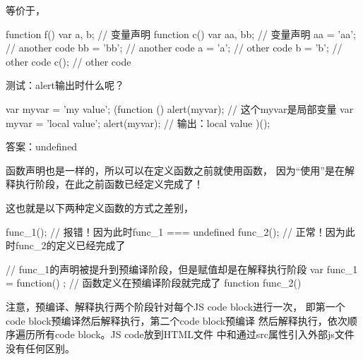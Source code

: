 等价于，

\begin{javascriptcode}
  function f() {
    var a, b; // 变量声明
    function c() {
      var aa, bb; // 变量声明
      aa = 'aa';
      // another code
      bb = 'bb';
      // another code
    }
    a = 'a';
    // other code
    b = 'b';
    // other code
    c();
    // other code
  }
\end{javascriptcode}

测试：alert输出时什么呢？

\begin{javascriptcode}
  var myvar = 'my value';
  (function () {
    alert(myvar); // 这个myvar是局部变量
    var myvar = 'local value';
    alert(myvar); // 输出：local value
  })();
\end{javascriptcode}

答案：undefined

函数声明也是一样的，所以可以在定义函数之前就使用函数，
因为“使用”是在解释执行阶段，在此之前函数已经定义完成了！

这也就是以下两种定义函数的方式之差别，

\begin{javascriptcode}
func_1(); // 报错！因为此时func_1 === undefined
func_2(); // 正常！因为此时func_2的定义已经完成了

// func_1的声明被提升到预编译阶段，但是赋值却是在解释执行阶段
var func_1 = function() { };
// 函数定义在预编译阶段就完成了
function func_2() { }
\end{javascriptcode}

注意，预编译、解释执行两个阶段针对每个JS code block进行一次，
即第一个code block预编译然后解释执行，第二个code block预编译
然后解释执行，依次顺序遍历所有code block。JS code放到HTML文件
中和通过src属性引入外部js文件没有任何区别。
